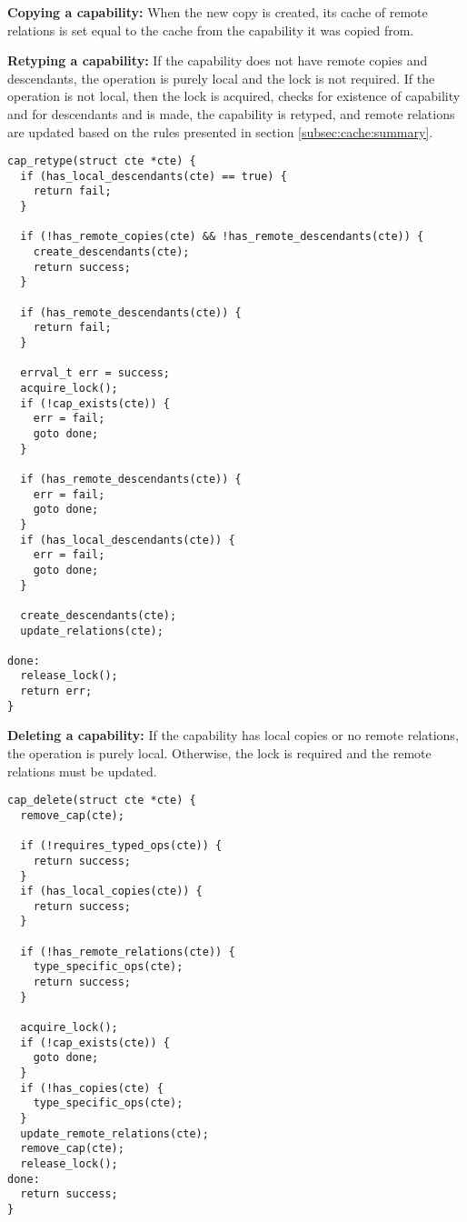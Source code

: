 \documentclass[a4paper,twoside]{report} %
\begin{document}
\textbf{Copying a capability:} When the new copy is created, its cache
of remote relations is set equal to the cache from the capability it
was copied from.

\textbf{Retyping a capability:} If the capability does not have remote
copies and descendants, the operation is purely local and the lock is
not required. If the operation is not local, then the lock is
acquired, checks for existence of capability and for descendants and
is made, the capability is retyped, and remote relations are updated
based on the rules presented in section \ref{subsec:cache:summary}.

\begin{verbatim}
cap_retype(struct cte *cte) {
  if (has_local_descendants(cte) == true) {
    return fail;
  }

  if (!has_remote_copies(cte) && !has_remote_descendants(cte)) {
    create_descendants(cte);
    return success;
  }

  if (has_remote_descendants(cte)) {
    return fail;
  }

  errval_t err = success;
  acquire_lock();
  if (!cap_exists(cte)) {
    err = fail;
    goto done;
  }

  if (has_remote_descendants(cte)) {
    err = fail;
    goto done;
  }
  if (has_local_descendants(cte)) {
    err = fail;
    goto done;
  }

  create_descendants(cte);
  update_relations(cte);

done:
  release_lock();
  return err;
}
\end{verbatim}

\textbf{Deleting a capability:} If the capability has local copies or
no remote relations, the operation is purely local. Otherwise, the
lock is required and the remote relations must be updated.

\begin{verbatim}
cap_delete(struct cte *cte) {
  remove_cap(cte);

  if (!requires_typed_ops(cte)) {
    return success;
  }
  if (has_local_copies(cte)) {
    return success;
  }

  if (!has_remote_relations(cte)) {
    type_specific_ops(cte);
    return success;
  }

  acquire_lock();
  if (!cap_exists(cte)) {
    goto done;
  }
  if (!has_copies(cte) {
    type_specific_ops(cte);
  }
  update_remote_relations(cte);
  remove_cap(cte);
  release_lock();
done:
  return success;
}
\end{verbatim}
\end{document}
